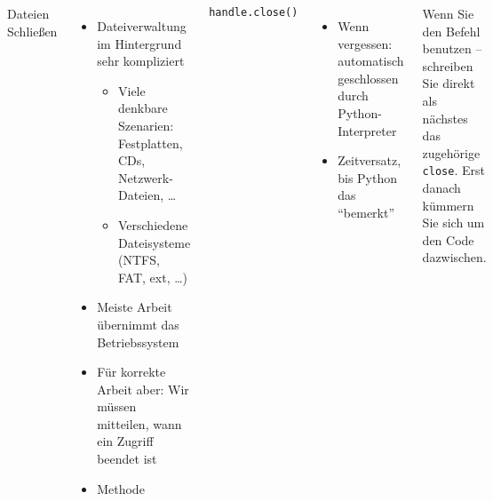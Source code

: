 \begin{frame}[fragile]
%
\begin{columns}[T]
\begin{Large}
	{Dateien Schließen}
	\vspace{6pt}
\end{Large}
%
\begin{itemize}
\item Dateiverwaltung im Hintergrund sehr kompliziert
	\begin{itemize}
	\item Viele denkbare Szenarien: Festplatten, CDs, Netzwerk-Dateien, \ldots
	\item Verschiedene Dateisysteme (NTFS, FAT, ext, \ldots)
	\end{itemize}
\item Meiste Arbeit übernimmt das Betriebssystem
\item Für korrekte Arbeit aber: Wir müssen mitteilen, wann ein Zugriff beendet ist
\item[\Thus] Methode 
\end{itemize}
%
\begin{codebox}
\begin{verbatim}
handle.close()
\end{verbatim}
\end{codebox}
%
\begin{itemize}
\item Wenn vergessen: \idR automatisch geschlossen durch Python-Interpreter
\item Zeitversatz, bis Python das \enquote{bemerkt}
\end{itemize}
%
\begin{hintbox}
\small
Wenn Sie den Befehl  benutzen -- schreiben Sie direkt als nächstes das zugehörige \texttt{close}. Erst danach kümmern Sie sich um den Code dazwischen.
\end{hintbox}
\end{columns}
%
\end{frame}


